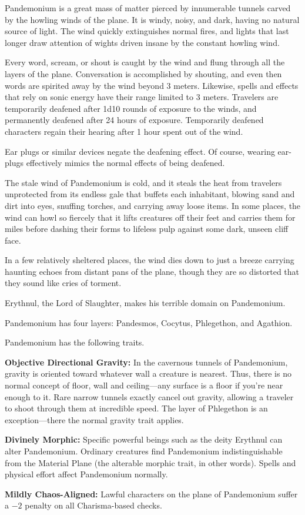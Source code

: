 Pandemonium is a great mass of matter pierced by innumerable tunnels carved by the howling winds of the plane. It is windy, noisy, and dark, having no natural source of light. The wind quickly extinguishes normal fires, and lights that last longer draw attention of wights driven insane by the constant howling wind.

Every word, scream, or shout is caught by the wind and flung through all the layers of the plane. Conversation is accomplished by shouting, and even then words are spirited away by the wind beyond 3 meters. Likewise, spells and effects that rely on sonic energy have their range limited to 3 meters. Travelers are temporarily deafened after 1d10 rounds of exposure to the winds, and permanently deafened after 24 hours of exposure. Temporarily deafened characters regain their hearing after 1 hour spent out of the wind.

Ear plugs or similar devices negate the deafening effect. Of course, wearing ear-plugs effectively mimics the normal effects of being deafened.

The stale wind of Pandemonium is cold, and it steals the heat from travelers unprotected from its endless gale that buffets each inhabitant, blowing sand and dirt into eyes, snuffing torches, and carrying away loose items. In some places, the wind can howl so fiercely that it lifts creatures off their feet and carries them for miles before dashing their forms to lifeless pulp against some dark, unseen cliff face.

In a few relatively sheltered places, the wind dies down to just a breeze carrying haunting echoes from distant pans of the plane, though they are so distorted that they sound like cries of torment.

Erythnul, the Lord of Slaughter, makes his terrible domain on Pandemonium.

Pandemonium has four layers: Pandesmos, Cocytus, Phlegethon, and Agathion.

Pandemonium has the following traits.
\begin{itemize*}
\item \textbf{Objective Directional Gravity:} In the cavernous tunnels of Pandemonium, gravity is oriented toward whatever wall a creature is nearest. Thus, there is no normal concept of floor, wall and ceiling---any surface is a floor if you're near enough to it. Rare narrow tunnels exactly cancel out gravity, allowing a traveler to shoot through them at incredible speed. The layer of Phlegethon is an exception---there the normal gravity trait applies.
\item \textbf{Divinely Morphic:} Specific powerful beings such as the deity Erythnul can alter Pandemonium. Ordinary creatures find Pandemonium indistinguishable from the Material Plane (the alterable morphic trait, in other words). Spells and physical effort affect Pandemonium normally.
\item \textbf{Mildly Chaos-Aligned:} Lawful characters on the plane of Pandemonium suffer a $-2$ penalty on all Charisma-based checks.
\end{itemize*}

